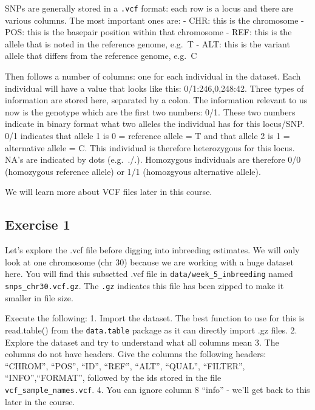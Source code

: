 \documentclass[
  letterpaper,
  DIV=11,
  numbers=noendperiod]{scrreprt}
\begin{document}
SNPs are generally stored in a \texttt{.vcf} format: each row is a locus
and there are various columns. The most important ones are: - CHR: this
is the chromosome - POS: this is the basepair position within that
chromosome - REF: this is the allele that is noted in the reference
genome, e.g.~T - ALT: this is the variant allele that differs from the
reference genome, e.g.~C

Then follows a number of columns: one for each individual in the
dataset. Each individual will have a value that looks like this:
0/1:246,0,248:42. Three types of information are stored here, separated
by a colon. The information relevant to us now is the genotype which are
the first two numbers: 0/1. These two numbers indicate in binary format
what two alleles the individual has for this locus/SNP. 0/1 indicates
that allele 1 is 0 = reference allele = T and that allele 2 is 1 =
alternative allele = C. This individual is therefore heterozygous for
this locus. NA's are indicated by dots (e.g.~./.). Homozygous
individuals are therefore 0/0 (homozygous reference allele) or 1/1
(homozgyous alternative allele).

We will learn more about VCF files later in this course.

\subsection{Exercise 1}\label{exercise-1-1}

Let's explore the .vcf file before digging into inbreeding estimates. We
will only look at one chromosome (chr 30) because we are working with a
huge dataset here. You will find this subsetted .vcf file in
\texttt{data/week\_5\_inbreeding} named \texttt{snps\_chr30.vcf.gz}. The
\texttt{.gz} indicates this file has been zipped to make it smaller in
file size.

Execute the following: 1. Import the dataset. The best function to use
for this is read.table() from the \texttt{data.table} package as it can
directly import .gz files. 2. Explore the dataset and try to understand
what all columns mean 3. The columns do not have headers. Give the
columns the following headers: ``CHROM'', ``POS'', ``ID'', ``REF'',
``ALT'', ``QUAL'', ``FILTER'', ``INFO'',``FORMAT'', followed by the ids
stored in the file \texttt{vcf\_sample\_names.vcf}. 4. You can ignore
column 8 ``info'' - we'll get back to this later in the course.
\end{document}
